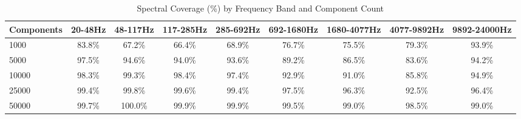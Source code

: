 \begin{table}[htbp]
\centering
\caption{Spectral Coverage (\%) by Frequency Band and Component Count}
\begin{tabular}{|l|c|c|c|c|c|c|c|c|}
\hline
Components & 20-48Hz & 48-117Hz & 117-285Hz & 285-692Hz & 692-1680Hz & 1680-4077Hz & 4077-9892Hz & 9892-24000Hz \\ \hline
1000 & 83.8\% & 67.2\% & 66.4\% & 68.9\% & 76.7\% & 75.5\% & 79.3\% & 93.9\% \\ \hline
5000 & 97.5\% & 94.6\% & 94.0\% & 93.6\% & 89.2\% & 86.5\% & 83.6\% & 94.2\% \\ \hline
10000 & 98.3\% & 99.3\% & 98.4\% & 97.4\% & 92.9\% & 91.0\% & 85.8\% & 94.9\% \\ \hline
25000 & 99.4\% & 99.8\% & 99.6\% & 99.4\% & 97.5\% & 96.3\% & 92.5\% & 96.4\% \\ \hline
50000 & 99.7\% & 100.0\% & 99.9\% & 99.9\% & 99.5\% & 99.0\% & 98.5\% & 99.0\% \\ \hline
\end{tabular}
\end{table}
